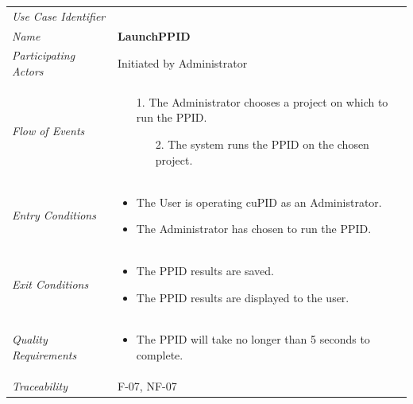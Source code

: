 \documentclass[12pt,letterpaper]{article}
\begin{document}
\begin{center}
	\begin{tabu} to 
		\toprule
		Use Case Identifier & \launchppid{} \\
		Name & {\bf LaunchPPID} \\
		Participating Actors & Initiated by Administrator \\
		Flow of Events & 
		\begin{minipage}[t]{\linewidth}
		    \begin{enumerate}
			    \item[1.] The Administrator chooses a project on which to run the PPID.
			    \begin{enumerate}
			        \item[2.] The system runs the PPID on the chosen project.
			    \end{enumerate}
			\end{enumerate}
	    \end{minipage} \\

		Entry Conditions &
		\begin{minipage}[t]{\linewidth}
			\begin{itemize}
			    \item The User is operating cuPID as an Administrator.
			    \item The Administrator has chosen to run the PPID.
	        \end{itemize}
	    \end{minipage} \\

		Exit Conditions &
		\begin{minipage}[t]{\linewidth}
			\begin{itemize}
			    \item The PPID results are saved.
			    \item The PPID results are displayed to the user.
	        \end{itemize}
	    \end{minipage} \\

		Quality Requirements &
		\begin{minipage}[t]{\linewidth}
			\begin{itemize}
			    \item The PPID will take no longer than 5 seconds to complete.
	        \end{itemize}
	    \end{minipage} \\

		Traceability & F-07, NF-07 \\
		\toprule
	\end{tabu}
\end{center}
\end{document}
